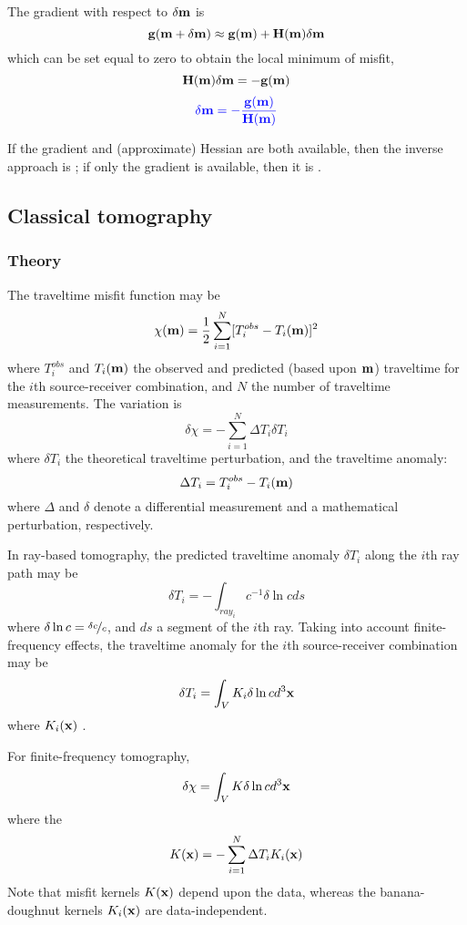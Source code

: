 The gradient with respect to $\delta\mathbf{m}$ is
\[ \mathbf{g}(\mathbf{m}+\delta\mathbf{m})\approx\mathbf{g}(\mathbf{m})+\mathbf{H}(\mathbf{m})\delta\mathbf{m} \]
which can be set equal to zero to obtain the local minimum of misfit,
\[ \mathbf{H}(\mathbf{m})\delta\mathbf{m}=-\mathbf{g}(\mathbf{m}) \]
\[ {\color{blue}\delta\mathbf{m}=-\frac{\mathbf{g}(\mathbf{m})}{\mathbf{H}(\mathbf{m})}} \]

If the gradient and (approximate) Hessian are both available,
then the inverse approach is ;
if only the gradient is available, then it is .

\subsection{Classical tomography}
\subsubsection{Theory}
The traveltime misfit function may be
\[ \chi(\mathbf{m})=\frac{1}{2}\sum_{i=1}^N[T_i^{obs}-T_i(\mathbf{m})]^2 \]
where $T_i^{obs}$ and $T_i(\mathbf{m})$ the observed and predicted (based upon $\mathbf{m}$) traveltime
for the $i$th source-receiver combination, and $N$ the number of traveltime measurements.
The variation is
\[ \delta\chi=-\sum_{i=1}^N\Delta T_i\delta T_i \]
where $\delta T_i$ the theoretical traveltime perturbation, and the traveltime anomaly:
\[ \Delta T_i=T_i^{obs}-T_i(\mathbf{m}) \]
where $\Delta$ and $\delta$ denote a differential measurement and a mathematical perturbation,
respectively.

In ray-based tomography,
the predicted traveltime anomaly $\delta T_i$ along the $i$th ray path may be
\[ \delta T_i=-\int_{ray_i}c^{-1}\delta\ln cds \]
where  $\delta\ln c=\nicefrac{\delta c}{c}$,
and $ds$ a segment of the $i$th ray.
Taking into account finite-frequency effects,
the traveltime anomaly for the $i$th source-receiver combination may be
\[ \delta T_i=\int_VK_i\delta\ln cd^3\mathbf{x} \]
where $K_i(\mathbf{x})$ .

For finite-frequency tomography,
\[ \delta\chi=\int_VK\delta\ln cd^3\mathbf{x} \]
where the 
\[ K(\mathbf{x})=-\sum_{i=1}^N\Delta T_iK_i(\mathbf{x}) \]
Note that misfit kernels $K(\mathbf{x})$ depend upon the data,
whereas the banana-doughnut kernels $K_i(\mathbf{x})$ are data-independent.

